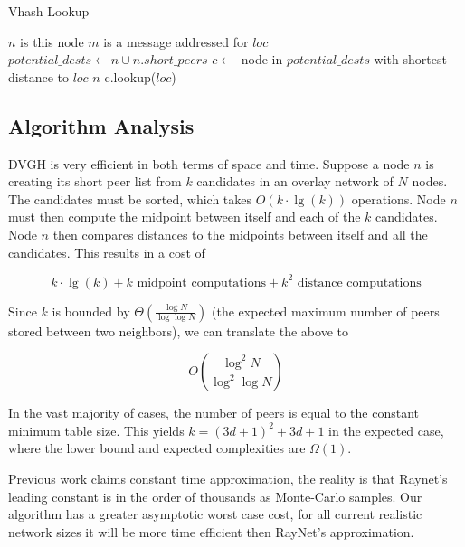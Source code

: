\documentclass[10pt, conference, letterpaper]{IEEEtran}
\begin{document}
\begin{algorithm}
\caption{Vhash Lookup}
\label{lookup}
\begin{algorithmic}[1] 
	\STATE $n$ is this node
	\STATE $m$ is a message addressed for $loc$
    \STATE $potential\_dests \leftarrow n \cup n.short\_peers$
    \STATE $c \leftarrow $ node in $ potential\_dests$ with shortest distance to $loc$
    	\RETURN $n$
    \ELSE
        \RETURN c.lookup($loc$)
    \ENDIF
\end{algorithmic}
\end{algorithm}



\subsection{Algorithm Analysis}
DVGH is very efficient in both terms of space and time.  
Suppose a node $n$ is creating its short peer list from $k$ candidates in an overlay network of $N$ nodes. 
The candidates must be sorted, which takes $O(k\cdot\lg(k))$ operations.  
Node $n$ must then compute the midpoint between itself and each of the $k$ candidates.  
Node $n$ then compares distances to the midpoints between itself and all the candidates.  
This results in a cost of 

\[ k\cdot\lg(k) + k \text{ midpoint computations}  + k^{2} \text{ distance computations} \]


Since  $k$ is  bounded by $\Theta(\frac{\log N}{\log \log N} )$ \cite{bern1991expected} (the expected maximum number of peers stored between two neighbors), we can translate the above to

\[O(\frac{\log^{2} N}{\log^{2} \log N} )\]

In the vast majority of cases, the number of peers is equal to the constant minimum table size. This yields $k=(3d+1)^2+3d+1$ in the expected case, where the lower bound and expected complexities are $\Omega(1)$.

Previous work \cite{raynet} claims constant time approximation, the reality is that Raynet's leading constant is in the order of thousands as Monte-Carlo samples.  
Our algorithm has a greater asymptotic worst case cost, for all current realistic network sizes it will be more time efficient then RayNet's approximation.
\end{document}

